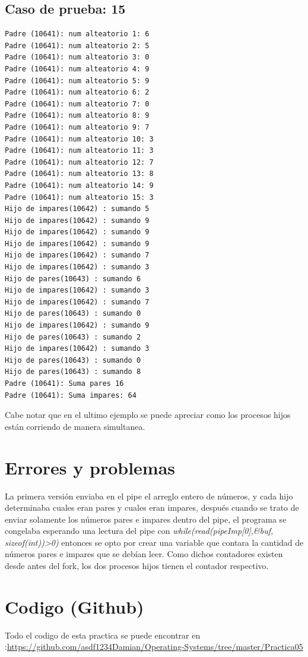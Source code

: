 \documentclass[12pt]{article}
\begin{document}
\subsection{Caso de prueba: 15}
\begin{verbatim}
Padre (10641): num alteatorio 1: 6
Padre (10641): num alteatorio 2: 5
Padre (10641): num alteatorio 3: 0
Padre (10641): num alteatorio 4: 9
Padre (10641): num alteatorio 5: 9
Padre (10641): num alteatorio 6: 2
Padre (10641): num alteatorio 7: 0
Padre (10641): num alteatorio 8: 9
Padre (10641): num alteatorio 9: 7
Padre (10641): num alteatorio 10: 3
Padre (10641): num alteatorio 11: 3
Padre (10641): num alteatorio 12: 7
Padre (10641): num alteatorio 13: 8
Padre (10641): num alteatorio 14: 9
Padre (10641): num alteatorio 15: 3
Hijo de impares(10642) : sumando 5 
Hijo de impares(10642) : sumando 9 
Hijo de impares(10642) : sumando 9 
Hijo de impares(10642) : sumando 9 
Hijo de impares(10642) : sumando 7 
Hijo de impares(10642) : sumando 3 
Hijo de pares(10643) : sumando 6 
Hijo de impares(10642) : sumando 3 
Hijo de impares(10642) : sumando 7 
Hijo de pares(10643) : sumando 0 
Hijo de impares(10642) : sumando 9 
Hijo de pares(10643) : sumando 2 
Hijo de impares(10642) : sumando 3 
Hijo de pares(10643) : sumando 0 
Hijo de pares(10643) : sumando 8 
Padre (10641): Suma pares 16 
Padre (10641): Suma impares: 64 
\end{verbatim}
Cabe notar que en el ultimo ejemplo se puede apreciar como los procesos hijos están corriendo de manera simultanea.
\section{Errores y problemas}
La primera versión enviaba en el pipe el arreglo entero de números, y cada hijo determinaba cuales eran pares y cuales eran impares, después cuando se trato de enviar solamente los números pares e impares dentro del pipe, el programa se congelaba esperando una lectura del pipe con \emph{while(read(pipeImp[0],&buf, sizeof(int))>0)} entonces se opto por crear una variable que contara la cantidad de números pares e impares que se debían leer. Como dichos contadores existen desde antes del fork, los dos procesos hijos tienen el contador respectivo. 
\section{Codigo (Github)}
Todo el codigo de esta practica se puede encontrar en :\url{https://github.com/asdf1234Damian/Operating-Systems/tree/master/Practica05}
\nocite{*}


\end{document}
